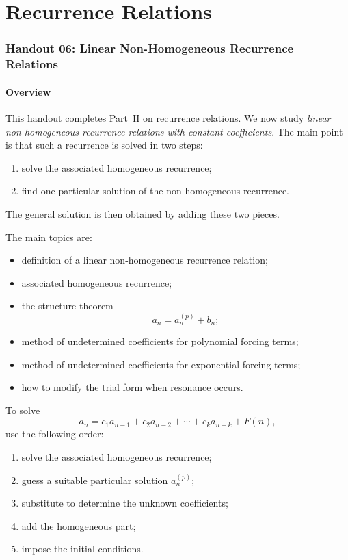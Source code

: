 \part{Recurrence Relations}
\section{Handout 06: Linear Non-Homogeneous Recurrence Relations}

\subsection{Overview}

This handout completes Part~II on recurrence relations. We now study \emph{linear non-homogeneous recurrence relations with constant coefficients}. The main point is that such a recurrence is solved in two steps:
\begin{enumerate}[leftmargin=*]
    \item solve the associated homogeneous recurrence;
    \item find one particular solution of the non-homogeneous recurrence.
\end{enumerate}

The general solution is then obtained by adding these two pieces.

The main topics are:
\begin{itemize}[leftmargin=*]
    \item definition of a linear non-homogeneous recurrence relation;
    \item associated homogeneous recurrence;
    \item the structure theorem
    \[
    a_n=a_n^{(p)}+b_n;
    \]
    \item method of undetermined coefficients for polynomial forcing terms;
    \item method of undetermined coefficients for exponential forcing terms;
    \item how to modify the trial form when resonance occurs.
\end{itemize}

\begin{examtip}[title={Main workflow for Handout 06}]
To solve
\[
a_n=c_1a_{n-1}+c_2a_{n-2}+\cdots+c_ka_{n-k}+F(n),
\]
use the following order:
\begin{enumerate}[leftmargin=*]
    \item solve the associated homogeneous recurrence;
    \item guess a suitable particular solution \(a_n^{(p)}\);
    \item substitute to determine the unknown coefficients;
    \item add the homogeneous part;
    \item impose the initial conditions.
\end{enumerate}
\end{examtip}

